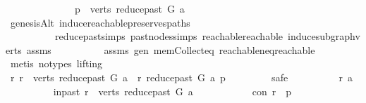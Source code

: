 \begin{isabellebody}
\ \ \ \ \isamarkupfalse%
\ \isanewline
\ \ \ \ \ \ \isamarkupfalse%
\ {\isachardoublequoteopen}p\ {\isasymin}\ verts\ {\isacharparenleft}{\kern0pt}reduce{\isacharunderscore}{\kern0pt}past\ G\ a{\isacharparenright}{\kern0pt}{\isachardoublequoteclose}\ \isamarkupfalse%
\ genesisAlt\ induce{\isacharunderscore}{\kern0pt}reachable{\isacharunderscore}{\kern0pt}preserves{\isacharunderscore}{\kern0pt}paths\isanewline
\ \ \ \ \ \ \ \ \ \ reduce{\isacharunderscore}{\kern0pt}past{\isachardot}{\kern0pt}simps\ past{\isacharunderscore}{\kern0pt}nodes{\isachardot}{\kern0pt}simps\ reachable{}{\isacharunderscore}{\kern0pt}reachable\ induce{\isacharunderscore}{\kern0pt}subgraph{\isacharunderscore}{\kern0pt}verts\ assms{\isacharparenleft}{\kern0pt}{}{\isacharparenright}{\kern0pt}\isanewline
\ \ \ \ \ \ \ \ \ \ assms{\isacharparenleft}{\kern0pt}{}{\isacharparenright}{\kern0pt}\ gen\ mem{\isacharunderscore}{\kern0pt}Collect{\isacharunderscore}{\kern0pt}eq\ reachable{\isacharunderscore}{\kern0pt}neq{\isacharunderscore}{\kern0pt}reachable{}\isanewline
\ \ \ \ \ \ \ \ \isamarkupfalse%
\ {\isacharparenleft}{\kern0pt}metis\ {\isacharparenleft}{\kern0pt}no{\isacharunderscore}{\kern0pt}types{\isacharcomma}{\kern0pt}\ lifting{\isacharparenright}{\kern0pt}{\isacharparenright}{\kern0pt}\ \isanewline
\isanewline
\ \ \ \ \isamarkupfalse%
\ \ \ \ \isanewline
\ \ \ \ \ \ \isamarkupfalse%
\ {\isachardoublequoteopen}{\isasymforall}r{\isachardot}{\kern0pt}\ r\ {\isasymin}\ verts\ {\isacharparenleft}{\kern0pt}reduce{\isacharunderscore}{\kern0pt}past\ G\ a{\isacharparenright}{\kern0pt}\ {\isasymlongrightarrow}\ r\ {\isasymrightarrow}\isactrlsup {\isacharasterisk}{\kern0pt}\isactrlbsub reduce{\isacharunderscore}{\kern0pt}past\ G\ a\isactrlesub \ p{\isachardoublequoteclose}\ \isanewline
\ \ \ \ \ \ \isamarkupfalse%
\ safe\isanewline
\ \ \ \ \ \ \ \ \isamarkupfalse%
\ r\ a\isanewline
\ \ \ \ \ \ \ \ \isamarkupfalse%
\ in{\isacharunderscore}{\kern0pt}past{\isacharcolon}{\kern0pt}\ {\isachardoublequoteopen}r\ {\isasymin}\ verts\ {\isacharparenleft}{\kern0pt}reduce{\isacharunderscore}{\kern0pt}past\ G\ a{\isacharparenright}{\kern0pt}{\isachardoublequoteclose}\isanewline
\ \ \ \ \ \ \ \ \isamarkupfalse%
\ \isamarkupfalse%
\ con{\isacharcolon}{\kern0pt}\ {\isachardoublequoteopen}r\ {\isasymrightarrow}\isactrlsup {\isacharasterisk}{\kern0pt}\ p{\isachardoublequoteclose}\ \isamarkupfalse%

\end{isabellebody}
